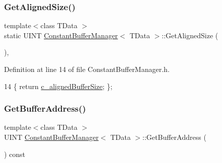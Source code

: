 \mbox{\label{class_constant_buffer_manager_a422de25f4764115e3bb1a747f231c7bd}} 
\subsubsection{\texorpdfstring{Get\+Aligned\+Size()}{GetAlignedSize()}}
{\footnotesize\ttfamily template$<$class T\+Data $>$ \\
static U\+I\+NT \mbox{\hyperlink{class_constant_buffer_manager}{Constant\+Buffer\+Manager}}$<$ T\+Data $>$\+::Get\+Aligned\+Size (\begin{DoxyParamCaption}{ }\end{DoxyParamCaption})\hspace{0.3cm}{\ttfamily [inline]}, {\ttfamily [static]}}



Definition at line 14 of file Constant\+Buffer\+Manager.\+h.


\begin{DoxyCode}
14 \{ \textcolor{keywordflow}{return} \mbox{\hyperlink{class_constant_buffer_manager_ac646a2089c56b988b2bac5aa9a1de723}{c\_alignedBufferSize}}; \};
\end{DoxyCode}
\mbox{\label{class_constant_buffer_manager_a1b2f4c04b281c3b47fd543d1bcb7a178}} 
\subsubsection{\texorpdfstring{Get\+Buffer\+Address()}{GetBufferAddress()}}
{\footnotesize\ttfamily template$<$class T\+Data $>$ \\
U\+I\+NT \mbox{\hyperlink{class_constant_buffer_manager}{Constant\+Buffer\+Manager}}$<$ T\+Data $>$\+::Get\+Buffer\+Address (\begin{DoxyParamCaption}{ }\end{DoxyParamCaption}) const\hspace{0.3cm}{\ttfamily [inline]}}



